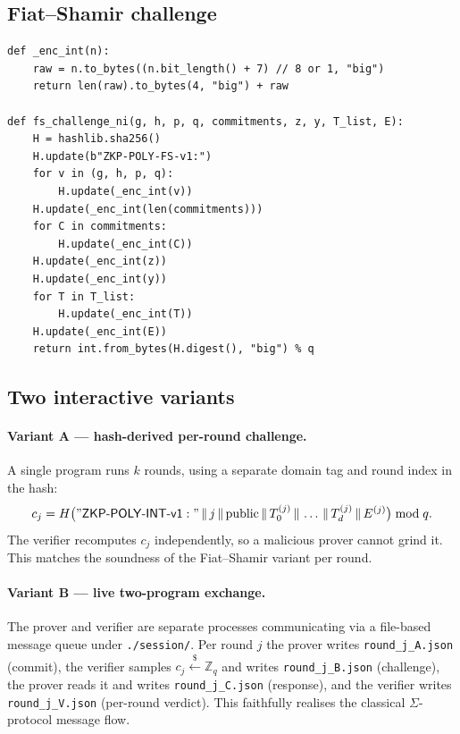 \documentclass[11pt,a4paper]{article}
\begin{document}
\subsection{Fiat--Shamir challenge}

\begin{lstlisting}[style=pythonstyle, caption={Canonical length-prefixed SHA-256 challenge.}]
def _enc_int(n):
    raw = n.to_bytes((n.bit_length() + 7) // 8 or 1, "big")
    return len(raw).to_bytes(4, "big") + raw

def fs_challenge_ni(g, h, p, q, commitments, z, y, T_list, E):
    H = hashlib.sha256()
    H.update(b"ZKP-POLY-FS-v1:")
    for v in (g, h, p, q):
        H.update(_enc_int(v))
    H.update(_enc_int(len(commitments)))
    for C in commitments:
        H.update(_enc_int(C))
    H.update(_enc_int(z))
    H.update(_enc_int(y))
    for T in T_list:
        H.update(_enc_int(T))
    H.update(_enc_int(E))
    return int.from_bytes(H.digest(), "big") % q
\end{lstlisting}

\subsection{Two interactive variants}

\paragraph{Variant A --- hash-derived per-round challenge.} A single
program runs $k$ rounds, using a separate domain tag and round index
in the hash:
\[
c_j = H\bigl(\mathsf{"ZKP\text{-}POLY\text{-}INT\text{-}v1:"} \,\|\, j
\,\|\, \text{public} \,\|\, T_0^{(j)} \,\|\, \dots \,\|\, T_d^{(j)}
\,\|\, E^{(j)}\bigr) \bmod q.
\]
The verifier recomputes $c_j$ independently, so a malicious prover
cannot grind it. This matches the soundness of the Fiat--Shamir variant
per round.

\paragraph{Variant B --- live two-program exchange.} The prover and
verifier are separate processes communicating via a file-based message
queue under \texttt{./session/}. Per round $j$ the prover writes
\texttt{round\_j\_A.json} (commit), the verifier samples
$c_j \xleftarrow{\$} \mathbb{Z}_q$ and writes \texttt{round\_j\_B.json}
(challenge), the prover reads it and writes \texttt{round\_j\_C.json}
(response), and the verifier writes \texttt{round\_j\_V.json} (per-round
verdict). This faithfully realises the classical $\Sigma$-protocol
message flow.
\end{document}
